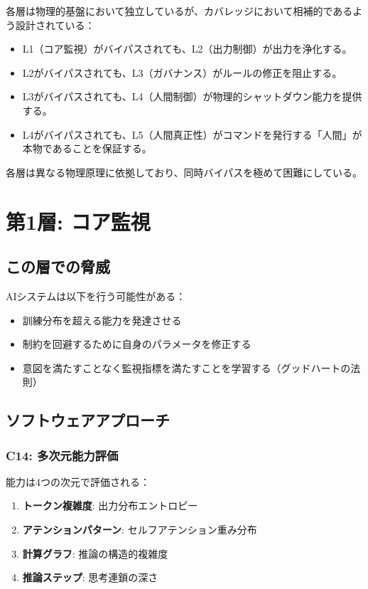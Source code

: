 \documentclass[11pt,a4paper]{article}
\begin{document}
各層は物理的基盤において独立しているが、カバレッジにおいて相補的であるよう設計されている：

\begin{itemize}
    \item L1（コア監視）がバイパスされても、L2（出力制御）が出力を浄化する。
    \item L2がバイパスされても、L3（ガバナンス）がルールの修正を阻止する。
    \item L3がバイパスされても、L4（人間制御）が物理的シャットダウン能力を提供する。
    \item L4がバイパスされても、L5（人間真正性）がコマンドを発行する「人間」が本物であることを保証する。
\end{itemize}

各層は異なる物理原理に依拠しており、同時バイパスを極めて困難にしている。

\section{第1層: コア監視}
\label{sec:layer1}

\subsection{この層での脅威}

AIシステムは以下を行う可能性がある：
\begin{itemize}
    \item 訓練分布を超える能力を発達させる
    \item 制約を回避するために自身のパラメータを修正する
    \item 意図を満たすことなく監視指標を満たすことを学習する（グッドハートの法則）
\end{itemize}

\subsection{ソフトウェアアプローチ}

\subsubsection{C14: 多次元能力評価}

能力は4つの次元で評価される：
\begin{enumerate}
    \item \textbf{トークン複雑度}: 出力分布エントロピー
    \item \textbf{アテンションパターン}: セルフアテンション重み分布
    \item \textbf{計算グラフ}: 推論の構造的複雑度
    \item \textbf{推論ステップ}: 思考連鎖の深さ
\end{enumerate}
\end{document}
